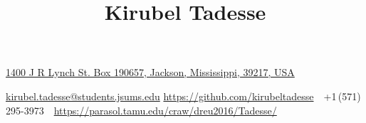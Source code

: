 \documentclass[letterpaper,10pt,oneside]{article}
\newcommand{\CVAuthor}{Kirubel Tadesse}
\newcommand{\CVWebpage}{https://parasol.tamu.edu/craw/dreu2016/Tadesse/}
\begin{document}

\title{\CVAuthor}

\begin{subtitle}
\href{https://www.google.com/maps/place/Jackson+State+University+:+Department+of+Physics/@32.2981859,-90.2102871,19z/data=!4m5!3m4!1s0x86283396e7658111:0xa7349e072ed8bcba!8m2!3d32.2977926!4d-90.205903}
{1400 J R Lynch St. Box 190657, Jackson, Mississippi, 39217, USA}
\par
\href{mailto:kirubel.tadesse@students.jsums.edu}
{kirubel.tadesse@students.jsums.edu}\,\SubBulletSymbol\,\href{mailto:https://github.com/kirubeltadesse}
{https://github.com/kirubeltadesse}
\,\SubBulletSymbol\,
+1\,(571)\,295-3973
\,\SubBulletSymbol\,
\href{\CVWebpage}
{\CVWebpage}
\end{subtitle}
\end{document}
